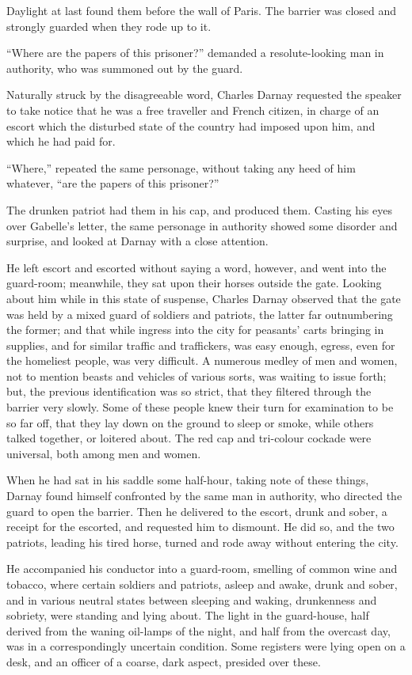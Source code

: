 Daylight at last found them before the wall of Paris.  The barrier
was closed and strongly guarded when they rode up to it.

``Where are the papers of this prisoner?'' demanded a resolute-looking
man in authority, who was summoned out by the guard.

Naturally struck by the disagreeable word, Charles Darnay requested
the speaker to take notice that he was a free traveller and French
citizen, in charge of an escort which the disturbed state of the
country had imposed upon him, and which he had paid for.

``Where,'' repeated the same personage, without taking any heed of him
whatever, ``are the papers of this prisoner?''

The drunken patriot had them in his cap, and produced them.  Casting his
eyes over Gabelle's letter, the same personage in authority showed
some disorder and surprise, and looked at Darnay with a close attention.

He left escort and escorted without saying a word, however, and went
into the guard-room; meanwhile, they sat upon their horses outside
the gate.  Looking about him while in this state of suspense, Charles
Darnay observed that the gate was held by a mixed guard of soldiers
and patriots, the latter far outnumbering the former; and that while
ingress into the city for peasants' carts bringing in supplies, and
for similar traffic and traffickers, was easy enough, egress, even
for the homeliest people, was very difficult.  A numerous medley of
men and women, not to mention beasts and vehicles of various sorts,
was waiting to issue forth; but, the previous identification was so
strict, that they filtered through the barrier very slowly.  Some of
these people knew their turn for examination to be so far off, that
they lay down on the ground to sleep or smoke, while others talked
together, or loitered about.  The red cap and tri-colour cockade were
universal, both among men and women.

When he had sat in his saddle some half-hour, taking note of these
things, Darnay found himself confronted by the same man in authority,
who directed the guard to open the barrier.  Then he delivered to the
escort, drunk and sober, a receipt for the escorted, and requested him
to dismount.  He did so, and the two patriots, leading his tired horse,
turned and rode away without entering the city.

He accompanied his conductor into a guard-room, smelling of common
wine and tobacco, where certain soldiers and patriots, asleep and
awake, drunk and sober, and in various neutral states between
sleeping and waking, drunkenness and sobriety, were standing and
lying about. The light in the guard-house, half derived from the
waning oil-lamps of the night, and half from the overcast day, was in
a correspondingly uncertain condition.  Some registers were lying
open on a desk, and an officer of a coarse, dark aspect, presided
over these.

